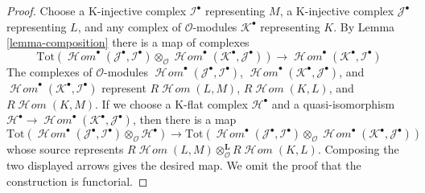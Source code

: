 \documentclass[10pt,a4paper]{amsart}
\theoremstyle{plain}
\theoremstyle{definition}
\theoremstyle{remark}
\numberwithin{equation}{subsection}
\def\SheafHom{\mathop{\mathcal{H}\!\mathit{om}}\nolimits}
\begin{document}
\begin{proof}
Choose a K-injective complex $\mathcal{I}^\bullet$ representing $M$,
a K-injective complex $\mathcal{J}^\bullet$ representing $L$, and
any complex of $\mathcal{O}$-modules $\mathcal{K}^\bullet$ representing $K$.
By Lemma \ref{lemma-composition} there is a map of complexes
$$
\text{Tot}\left(
\SheafHom^\bullet(\mathcal{J}^\bullet, \mathcal{I}^\bullet)
\otimes_\mathcal{O}
\SheafHom^\bullet(\mathcal{K}^\bullet, \mathcal{J}^\bullet)
\right)
\longrightarrow
\SheafHom^\bullet(\mathcal{K}^\bullet, \mathcal{I}^\bullet)
$$
The complexes of $\mathcal{O}$-modules
$\SheafHom^\bullet(\mathcal{J}^\bullet, \mathcal{I}^\bullet)$,
$\SheafHom^\bullet(\mathcal{K}^\bullet, \mathcal{J}^\bullet)$, and
$\SheafHom^\bullet(\mathcal{K}^\bullet, \mathcal{I}^\bullet)$
represent $R\SheafHom(L, M)$, $R\SheafHom(K, L)$, and $R\SheafHom(K, M)$.
If we choose a K-flat complex $\mathcal{H}^\bullet$ and a quasi-isomorphism
$\mathcal{H}^\bullet \to
\SheafHom^\bullet(\mathcal{K}^\bullet, \mathcal{J}^\bullet)$,
then there is a map
$$
\text{Tot}\left(
\SheafHom^\bullet(\mathcal{J}^\bullet, \mathcal{I}^\bullet)
\otimes_\mathcal{O} \mathcal{H}^\bullet
\right)
\longrightarrow
\text{Tot}\left(
\SheafHom^\bullet(\mathcal{J}^\bullet, \mathcal{I}^\bullet)
\otimes_\mathcal{O}
\SheafHom^\bullet(\mathcal{K}^\bullet, \mathcal{J}^\bullet)
\right)
$$
whose source represents
$R\SheafHom(L, M) \otimes_\mathcal{O}^\mathbf{L} R\SheafHom(K, L)$.
Composing the two displayed arrows gives the desired map. We omit the
proof that the construction is functorial.
\end{proof}
\end{document}
